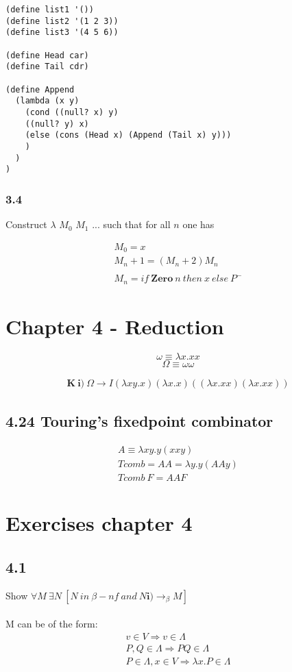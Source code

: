 \documentclass[11pt]{article}
\begin{document}
\begin{verbatim}
(define list1 '())
(define list2 '(1 2 3))
(define list3 '(4 5 6))

(define Head car)
(define Tail cdr)

(define Append
  (lambda (x y)
    (cond ((null? x) y)
    ((null? y) x)
    (else (cons (Head x) (Append (Tail x) y)))
    )
  )
)
\end{verbatim}

\subsubsection*{3.4}
Construct $\lambda$ $M_0$ $M_1$ ... such that for all $n$ one has

\begin{gather*}
M_0 = x \\
M_n+1 = (M_n+2) M_n \\
\\
M_n = if\ \mathbf{Zero}\ n\ then\ x\ else\ P^-   
\end{gather*}


\section*{Chapter 4 - Reduction}

\[
\omega \equiv \lambda x. xx
\]
\[
\Omega \equiv \omega \omega
\]

\begin{gather*}
\mathbf{K\ i)}\ \Omega \rightarrow I
(\lambda xy.x)(\lambda x.x) ((\lambda x.xx)(\lambda x.xx))
\end{gather*}

\subsection*{4.24 Touring's fixedpoint combinator}
\begin{gather*}
A \equiv \lambda xy.y(xxy) \\
Tcomb = AA = \lambda y.y(AAy)\\
Tcomb\ F = AAF
\end{gather*}

\clearpage
\section*{Exercises chapter 4}
\subsection*{4.1}
Show $\forall M\ \exists N\ [N\ in\ \beta -nf\ and\ N \mathbf{i)} \rightarrow _\beta M]$ \\
\\
M can be of the form:
\begin{gather*}
v \in V \Rightarrow v \in \Lambda \\
P,Q \in \Lambda \Rightarrow PQ \in \Lambda \\
P \in \Lambda, x \in V \Rightarrow \lambda x.P \in \Lambda
\end{gather*}
\end{document}
